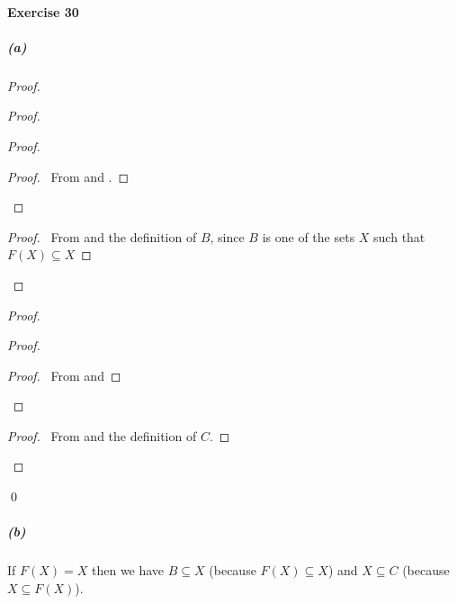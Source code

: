 \documentclass{report}
\begin{document}
    \paragraph{Exercise 30}
    \subparagraph{(a)}
    \begin{proof}
        \pf
        \begin{proof}
            \begin{proof}
                \begin{proof}
                    \pf\ From  and .
                \end{proof}
            \end{proof}
            \begin{proof}
                \pf\ From  and the definition of $B$, since $B$ is one of the sets $X$ such that
                $F(X) \subseteq X$
            \end{proof}
        \end{proof}
        \begin{proof}
            \begin{proof}
                \begin{proof}
                    \pf\ From  and 
                \end{proof}
            \end{proof}
            \begin{proof}
                \pf\ From  and the definition of $C$.
            \end{proof}
        \end{proof}
        \qed
    \end{proof}

    \subparagraph{(b)}
    If $F(X) = X$ then we have $B \subseteq X$ (because $F(X) \subseteq X$) and $X \subseteq C$
    (because $X \subseteq F(X)$).
\end{document}
